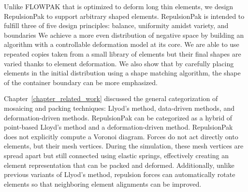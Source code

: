 \newtext
{
Unlike FLOWPAK that is optimized to deform long thin elements, 
we design RepulsionPak to support arbitrary shaped elements.
RepulsionPak is intended to fulfill three of five design principles:
balance, uniformity amidst variety, and boundaries  
We achieve a more even distribution of negative space by building an algorithm with a controllable deformation model at its core. 
We are able to use repeated copies taken from a small library of elements 
but their final shapes are varied thanks to element deformation.
We also show that by carefully placing elements in the initial distribution using a shape matching algorithm, 
the shape of the container boundary can be more emphasized.
}

\nnewtext
{
Chapter~\ref{chapter_related_work} discussed the general categorization of mosaicing and packing techniques: 
Llyod's method, data-driven methods, and deformation-driven methods.
RepulsionPak can be categorized as a hybrid of point-based Lloyd's method and a deformation-driven method.
RepulsionPak does not explicitly compute a Voronoi diagram.
Forces do not act directly onto elements, but their mesh vertices.
During the simulation, these mesh vertices are spread apart but still connected using elastic springs,
effectively creating an element representation that can be packed and deformed.
Additionally, unlike previous variants of Llyod's method, 
repulsion forces can automatically rotate elements so that neighboring element alignments can be improved. 
}





